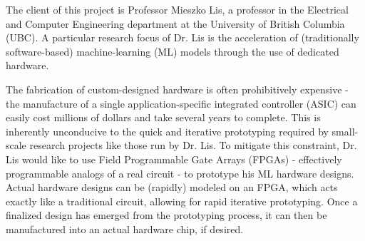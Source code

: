 The client of this project is Professor Mieszko Lis, a professor in the Electrical and Computer Engineering department at the University of British Columbia (UBC). A particular research focus of Dr. Lis is the acceleration of (traditionally software-based) machine-learning (ML) models through the use of dedicated hardware. 

The fabrication of custom-designed hardware is often prohibitively expensive - the manufacture of a single application-specific integrated controller (ASIC) can easily cost millions of dollars and take several years to complete. This is inherently unconducive to the quick and iterative prototyping required by small-scale research projects like those run by Dr. Lis. To mitigate this constraint, Dr. Lis would like to use Field Programmable Gate Arrays (FPGAs) - effectively programmable analogs of a real circuit - to prototype his ML hardware designs. Actual hardware designs can be (rapidly) modeled on an FPGA, which acts exactly like a traditional circuit, allowing for rapid iterative prototyping. Once a finalized design has emerged from the prototyping process, it can then be manufactured into an actual hardware chip, if desired.